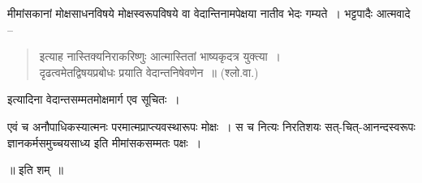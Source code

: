 {मीमांसकानां मोक्षसाधनविषये मोक्षस्वरूपविषये वा वेदान्तिनामपेक्षया नातीव भेदः गम्यते~। भट्टपादैः आत्मवादे –
\begin{verse}
इत्याह नास्तिक्यनिराकरिष्णुः आत्मास्तितां भाष्यकृदत्र युक्त्या~। \\
दृढत्वमेतद्विषयप्रबोधः प्रयाति वेदान्तनिषेवणेन~॥ (श्लो.वा.)
\end{verse}
इत्यादिना वेदान्तसम्मतमोक्षमार्ग एव सूचितः~। 

एवं च अनौपाधिकस्यात्मनः परमात्मप्राप्त्यवस्थारूपः मोक्षः~। स च नित्यः निरतिशयः सत्-चित्-आनन्दस्वरूपः ज्ञानकर्मसमुच्चयसाध्य इति मीमांसकसम्मतः पक्षः~। 

\centerline{॥ इति शम्~॥}

\articleend
}
